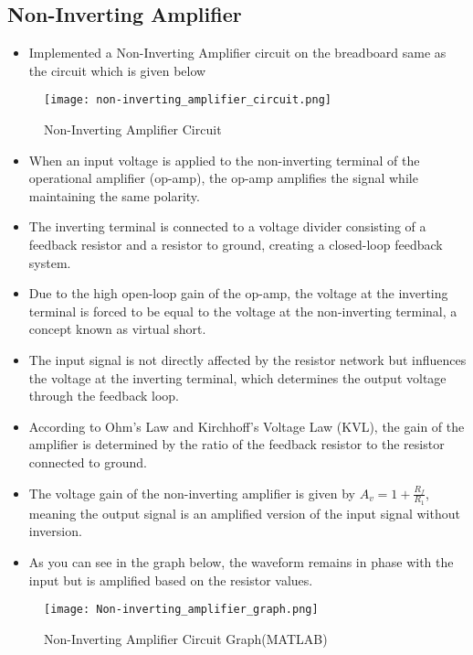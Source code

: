 \documentclass[9pt,conference]{IEEEtran}
\begin{document}
\subsection{Non-Inverting Amplifier}
\begin{itemize}
    \item Implemented a Non-Inverting Amplifier circuit on the breadboard same as the circuit which is given below
\end{itemize}
\begin{figure}[H]
    \centering
    \texttt{[image: non-inverting\_amplifier\_circuit.png]}
    \caption{Non-Inverting Amplifier Circuit}
    \label{fig:clamper_circuit}
\end{figure}

\begin{itemize}
    \item When an input voltage is applied to the non-inverting terminal of the operational amplifier (op-amp), the op-amp amplifies the signal while maintaining the same polarity.
    \item The inverting terminal is connected to a voltage divider consisting of a feedback resistor and a resistor to ground, creating a closed-loop feedback system.
    \item Due to the high open-loop gain of the op-amp, the voltage at the inverting terminal is forced to be equal to the voltage at the non-inverting terminal, a concept known as virtual short.
    \item The input signal is not directly affected by the resistor network but influences the voltage at the inverting terminal, which determines the output voltage through the feedback loop.
    \item According to Ohm's Law and Kirchhoff's Voltage Law (KVL), the gain of the amplifier is determined by the ratio of the feedback resistor to the resistor connected to ground.
    \item The voltage gain of the non-inverting amplifier is given by \( A_v = 1 + \frac{R_f}{R_1} \), meaning the output signal is an amplified version of the input signal without inversion.
    \item As you can see in the graph below, the waveform remains in phase with the input but is amplified based on the resistor values.
\end{itemize}

\begin{figure}[H]
    \centering
    \texttt{[image: Non-inverting\_amplifier\_graph.png]}
    \caption{Non-Inverting Amplifier Circuit Graph(MATLAB)}
    \label{fig:positive_clamper}
\end{figure}
\end{document}
